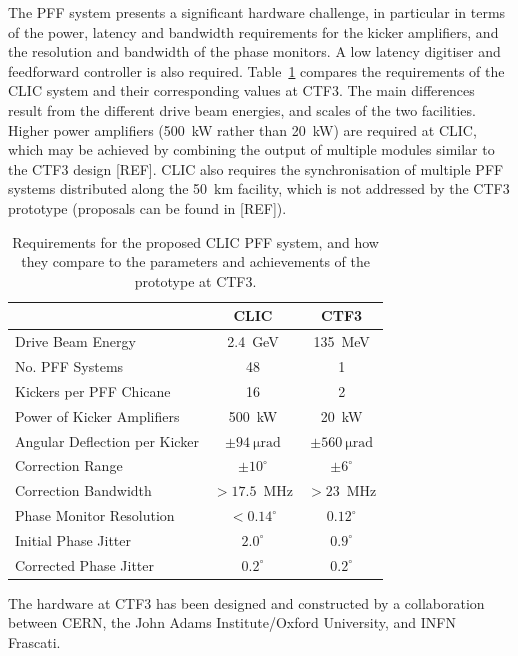 \documentclass[%
 reprint,
superscriptaddress,
 amsmath,amssymb,
 prl,
]{revtex4-1}
\begin{document}
The PFF system presents a significant hardware challenge, in particular in 
terms of the power, latency and bandwidth requirements for the kicker 
amplifiers, and the resolution and bandwidth of the phase monitors. A low 
latency digitiser and feedforward controller is also required.
Table~\ref{tab:pffspecs} compares the requirements of the CLIC system and their 
corresponding values at CTF3. 
The main differences result from the different drive beam energies, and scales 
of the two facilities. Higher power amplifiers (500~kW rather than 20~kW) are 
required at CLIC, which may be achieved by combining the output of multiple 
modules similar to the CTF3 design [REF]. CLIC also requires the 
synchronisation of multiple PFF systems distributed along the 50~km facility, 
which is not addressed by the CTF3 prototype (proposals can be found in [REF]).

\begin{table}
	\caption{\label{tab:pffspecs}
	    Requirements for the proposed CLIC PFF system, and how they compare to 
	    the parameters and achievements of the prototype at CTF3.}
\begin{ruledtabular}
	\begin{tabular}{lcc}
		 & CLIC & CTF3 \\
		\hline
		Drive Beam Energy & 2.4~GeV & 135~MeV \\
		No. PFF Systems & 48 & 1 \\
		Kickers per PFF Chicane & 16 & 2 \\
		Power of Kicker Amplifiers & 500~kW & 20~kW \\
		Angular Deflection per Kicker & \(\pm94~\mathrm{\mu rad}\) & 
		\(\pm560~\mathrm{\mu rad}\) \\
		Correction Range & \(\pm 10^\circ\) & \(\pm 6^\circ\) \\
		Correction Bandwidth & \(>17.5\)~MHz & \(>23\)~MHz \\
		Phase Monitor Resolution & \(< 0.14^\circ\) & \(0.12^\circ\)  \\
		Initial Phase Jitter & \(2.0^\circ\) & \(0.9^\circ\) \\
		Corrected Phase Jitter & \(0.2^\circ\) & \(0.2^\circ\) \\
	\end{tabular}
\end{ruledtabular}
\end{table}

The hardware at CTF3 has been designed and constructed by a collaboration 
between CERN, the John Adams Institute/Oxford University, and INFN Frascati.
\end{document}
